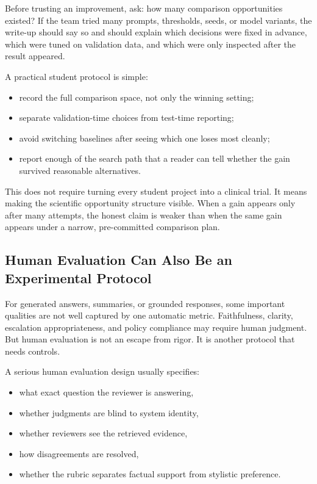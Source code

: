 \begin{decisionbox}
Before trusting an improvement, ask: how many comparison opportunities existed? If the team tried many prompts, thresholds, seeds, or model variants, the write-up should say so and should explain which decisions were fixed in advance, which were tuned on validation data, and which were only inspected after the result appeared.
\end{decisionbox}

A practical student protocol is simple:
\begin{itemize}[leftmargin=*]
\item record the full comparison space, not only the winning setting;
\item separate validation-time choices from test-time reporting;
\item avoid switching baselines after seeing which one loses most cleanly;
\item report enough of the search path that a reader can tell whether the gain survived reasonable alternatives.
\end{itemize}

This does not require turning every student project into a clinical trial. It means making the scientific opportunity structure visible. When a gain appears only after many attempts, the honest claim is weaker than when the same gain appears under a narrow, pre-committed comparison plan.

\subsection{Human Evaluation Can Also Be an Experimental Protocol}

For generated answers, summaries, or grounded responses, some important qualities are not well captured by one automatic metric. Faithfulness, clarity, escalation appropriateness, and policy compliance may require human judgment. But human evaluation is not an escape from rigor. It is another protocol that needs controls.

A serious human evaluation design usually specifies:
\begin{itemize}[leftmargin=*]
\item what exact question the reviewer is answering,
\item whether judgments are blind to system identity,
\item whether reviewers see the retrieved evidence,
\item how disagreements are resolved,
\item whether the rubric separates factual support from stylistic preference.
\end{itemize}

